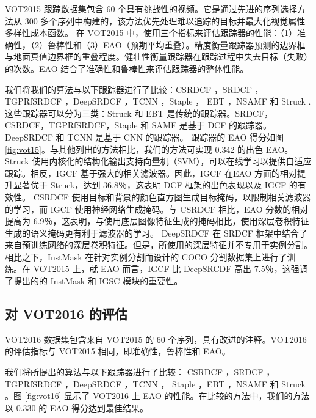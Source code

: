 VOT2015 \cite{Kristan2015TheVO} 跟踪数据集包含 60 个具有挑战性的视频。它是通过先进的序列选择方法从 300 多个序列中构建的，该方法优先处理难以追踪的目标并最大化视觉属性多样性成本函数。
在 VOT2015 中，使用三个指标来评估跟踪器的性能：（1）准确性，（2）鲁棒性和（3）EAO（预期平均重叠）。精度衡量跟踪器预测的边界框与地面真值边界框的重叠程度。健壮性衡量跟踪器在跟踪过程中失去目标（失败）的次数。EAO 结合了准确性和鲁棒性来评估跟踪器的整体性能。

我们将我们的算法与以下跟踪器进行了比较：CSRDCF \cite{Lukezic2017DiscriminativeCF}，SRDCF \cite{Danelljan2015LearningSR}，TGPRfSRDCF \cite{gao2018tracking}，DeepSRDCF \cite{Danelljan2015ConvolutionalFF}，TCNN \cite{nam2016modeling}，Staple \cite{Bertinetto2016StapleC}， EBT \cite{Zhu2016BeyondLS}，NSAMF \cite{Hua2015OnlineOT} 和 Struck \cite{Hare2011StruckSO}.
这些跟踪器可以分为三类：Struck 和 EBT 是传统的跟踪器。SRDCF，CSRDCF，TGPRfSRDCF，Staple 和 SAMF 是基于 DCF 的跟踪器。DeepSRDCF 和 TCNN 是基于 CNN 的跟踪器。
跟踪器的 EAO 得分如图 \ref{fig:vot15}。与其他列出的方法相比，我们的方法可实现 0.342 的出色 EAO。
Struck 使用内核化的结构化输出支持向量机（SVM），可以在线学习以提供自适应跟踪。相反，IGCF 基于强大的相关滤波器。因此，IGCF 在EAO 方面的相对提升显著优于 Struck，达到 36.8％，这表明 DCF 框架的出色表现以及 IGCF 的有效性。
CSRDCF 使用目标和背景的颜色直方图生成目标掩码，以限制相关滤波器的学习，而 IGCF 使用神经网络生成掩码。与 CSRDCF 相比，EAO 分数的相对提高为 6.9％，这表明，与使用底层图像特征生成的掩码相比，使用深层卷积特征生成的语义掩码更有利于滤波器的学习。
DeepSRDCF 在 SRDCF 框架中结合了来自预训练网络的深层卷积特征。但是，所使用的深层特征并不专用于实例分割。相比之下，InstMask 在针对实例分割而设计的 COCO 分割数据集上进行了训练。在 VOT2015 上，就 EAO 而言，IGCF 比 DeepSRCDF 高出 7.5％，这强调了提出的的 InstMask 和 IGSC 模块的重要性。

\subsection{对 VOT2016 的评估}
VOT2016 \cite{Kristan2016TheVO} 数据集包含来自 VOT2015 的 60 个序列，具有改进的注释。VOT2016 的评估指标与 VOT2015 相同，即准确性，鲁棒性和 EAO。

我们将所提出的算法与以下跟踪器进行了比较：
CSRDCF \cite{Lukezic2017DiscriminativeCF}，SRDCF \cite{Danelljan2015LearningSR}，TGPRfSRDCF \cite{gao2018tracking}，DeepSRDCF \cite{Danelljan2015ConvolutionalFF}，TCNN \cite{nam2016modeling}， Staple \cite{Bertinetto2016StapleC}，EBT \cite{Zhu2016BeyondLS}，NSAMF \cite{Hua2015OnlineOT} 和 Struck \cite{Hare2011StruckSO}。图 \ref{fig:vot16} 显示了 VOT2016 上 EAO 的性能。在比较的方法中，我们的方法以 0.330 的 EAO 得分达到最佳结果。

